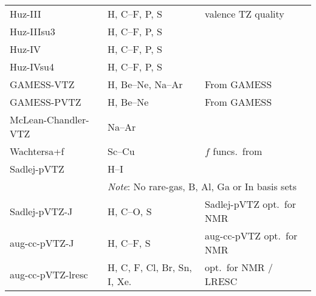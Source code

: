 \begin{longtable}{lll}
Huz-III & H, C--F, P, S & \cite{wkijc19,mswkjcp76,huzinagaintern} valence TZ quality\\
Huz-IIIsu3 & H, C--F, P, S & \cite{wkijc19,mswkjcp76,huzinagaintern}\\
Huz-IV & H, C--F, P, S & \cite{wkijc19,mswkjcp76,huzinagaintern}\\
Huz-IVsu4 & H, C--F, P, S & \cite{wkijc19,mswkjcp76,huzinagaintern}\\
\hline
GAMESS-VTZ & H, Be--Ne, Na--Ar & \cite{thdjcp55,admgscjcp72,ajhwjcp52} From GAMESS \\
GAMESS-PVTZ & H, Be--Ne & \cite{thdjcp55,admgscjcp72,ajhwjcp52} From GAMESS \\
%
McLean-Chandler-VTZ & Na--Ar & \cite{admgscjcp72} \\
Wachtersa+f & Sc--Cu & \cite{ajhwjcp52,wachterintern1969} $f$ funcs.\ from \cite{cwbsrllabjcp91} \\
Sadlej-pVTZ & H--I & \cite{ajstca79,ajsmujmst234,ajstca81,ajstca81-2} \\
  & \multicolumn{2}{l}{\emph{Note}: No rare-gas, B, Al, Ga or In basis sets} \\
%
Sadlej-pVTZ-J & H, C--O, S & \cite{pfpgaaspasjcp115} Sadlej-pVTZ opt.\ for NMR \\
aug-cc-pVTZ-J & H, C--F, S & \cite{pfpgaaspasjcp115} aug-cc-pVTZ opt.\ for NMR \\
aug-cc-pVTZ-lresc & H, C, F, Cl, Br, Sn, I, Xe. & \cite{melomaldojcp12} opt.\ for NMR / LRESC\\


\end{longtable}
